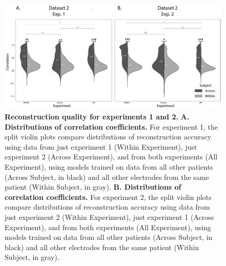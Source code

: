 \documentclass{article}
\begin{document}
\begin{figure}[ptb]
\centering
\includegraphics[width=\textwidth]{figs/supplemental_2}
\caption{\small \textbf{Reconstruction quality for experiments 1 and 2.} \textbf{A. Distributions
      of correlation coefficients.} For experiment 1, the split violin plots compare distributions of reconstruction accuracy using data from just experiment 1 (Within Experiment), just experiment 2 (Across Experiment), and from both experiments (All Experiment), using models trained on data from all other patients (Across Subject, in black) and all other electrodes from the same patient (Within Subject, in gray). \textbf{B.  Distributions
      of correlation coefficients.} For experiment 2, the split violin plots compare distributions of reconstruction accuracy using data from just experiment 2 (Within Experiment), just experiment 1 (Across Experiment), and from both experiments (All Experiment), using models trained on data from all other patients (Across Subject, in black) and all other electrodes from the same patient (Within Subject, in gray). }
\label{fig:supplemental_2}
\end{figure}
\end{document}
